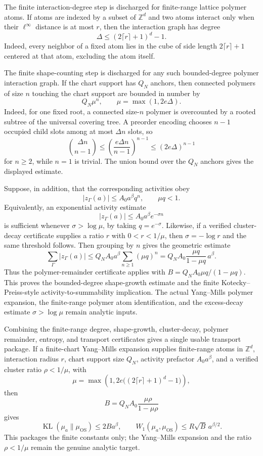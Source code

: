 The finite interaction-degree step is discharged for finite-range lattice
polymer atoms. If atoms are indexed by a subset of $\mathbb Z^d$ and two atoms
interact only when their $\ell^\infty$ distance is at most $r$, then the
interaction graph has degree
\[
  \Delta\leq (2\lceil r\rceil+1)^d-1 .
\]
Indeed, every neighbor of a fixed atom lies in the cube of side length
$2\lceil r\rceil+1$ centered at that atom, excluding the atom itself.

The finite shape-counting step is discharged for any such bounded-degree
polymer interaction graph. If the chart support has $Q_N$ anchors, then
connected polymers of size $n$ touching the chart support are bounded in number
by
\[
  Q_N\mu^n,
  \qquad
  \mu=\max(1,2e\Delta).
\]
Indeed, for one fixed root, a connected size-$n$ polymer is overcounted by a
rooted subtree of the universal covering tree. A preorder encoding chooses
$n-1$ occupied child slots among at most $\Delta n$ slots, so
\[
  \binom{\Delta n}{n-1}
  \leq
  \left(\frac{e\Delta n}{n-1}\right)^{n-1}
  \leq
  (2e\Delta)^{n-1}
\]
for $n\geq2$, while $n=1$ is trivial. The union bound over the $Q_N$ anchors
gives the displayed estimate.

Suppose, in addition, that the corresponding activities obey
\[
  |z_\Gamma(a)|\leq A_0a^\beta q^n,\qquad \mu q<1 .
\]
Equivalently, an exponential activity estimate
\[
  |z_\Gamma(a)|\leq A_0a^\beta e^{-\sigma n}
\]
is sufficient whenever $\sigma>\log\mu$, by taking $q=e^{-\sigma}$.
Likewise, if a verified cluster-decay certificate supplies a ratio $r$ with
$0<r<1/\mu$, then $\sigma=-\log r$ and the same threshold follows.
Then grouping by $n$ gives the geometric estimate
\[
  \sum_\Gamma |z_\Gamma(a)|
  \leq
  Q_NA_0a^\beta\sum_{n\geq1}(\mu q)^n
  =
  Q_NA_0\frac{\mu q}{1-\mu q}\,a^\beta .
\]
Thus the polymer-remainder certificate applies with
$B=Q_NA_0\mu q/(1-\mu q)$. This proves the bounded-degree
shape-growth estimate and the finite Kotecky--Preiss-style
activity-to-summability implication. The actual Yang--Mills polymer expansion,
the finite-range polymer atom identification, and the excess-decay estimate
$\sigma>\log\mu$ remain analytic inputs.

Combining the finite-range degree, shape-growth, cluster-decay, polymer
remainder, entropy, and transport certificates gives a single usable transport
package. If a finite-chart Yang--Mills expansion supplies finite-range atoms in
$\mathbb Z^d$, interaction radius $r$, chart support size $Q_N$, activity
prefactor $A_0a^\beta$, and a verified cluster ratio $\rho<1/\mu$, with
\[
  \mu=\max\!\left(1,2e\big((2\lceil r\rceil+1)^d-1\big)\right),
\]
then
\[
  B=Q_NA_0\frac{\mu\rho}{1-\mu\rho}
\]
gives
\[
  \operatorname{KL}(\mu_a\|\mu_{\mathrm{OS}})
  \leq 2B a^\beta,
  \qquad
  W_1(\mu_a,\mu_{\mathrm{OS}})
  \leq R\sqrt B\,a^{\beta/2}.
\]
This packages the finite constants only; the Yang--Mills expansion and the
ratio $\rho<1/\mu$ remain the genuine analytic target.

